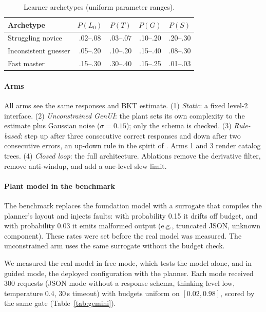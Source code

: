 \documentclass[conference]{IEEEtran}
\begin{document}
\begin{table}[t]
\centering
\caption{Learner archetypes (uniform parameter ranges).}
\label{tab:archetypes}
\begin{tabular}{lcccc}
\toprule
Archetype & $P(L_0)$ & $P(T)$ & $P(G)$ & $P(S)$\\
\midrule
Struggling novice & .02--.08 & .03--.07 & .10--.20 & .20--.30\\
Inconsistent guesser & .05--.20 & .10--.20 & .15--.40 & .08--.30\\
Fast master & .15--.30 & .30--.40 & .15--.25 & .01--.03\\
\bottomrule
\end{tabular}
\end{table}

\paragraph*{Arms}
All arms see the same responses and BKT estimate. (1) \emph{Static}: a fixed
level-2 interface. (2) \emph{Unconstrained GenUI}: the plant sets its own
complexity to the estimate plus Gaussian noise ($\sigma=0.15$); only the schema
is checked. (3) \emph{Rule-based}: step up after three consecutive correct
responses and down after two consecutive errors, an up-down rule in the
spirit of \cite{levitt1971updown}. Arms 1 and 3 render catalog trees. (4) \emph{Closed loop}:
the full architecture. Ablations remove the derivative filter, remove
anti-windup, and add a one-level slew limit.

\paragraph*{Plant model in the benchmark}
The benchmark replaces the foundation model with a surrogate that compiles
the planner's layout and injects faults: with probability 0.15 it
drifts off budget, and with probability 0.03 it emits malformed output
(e.g., truncated JSON, unknown component). These rates were set before the real model was measured.
The unconstrained arm uses the same surrogate without the budget check.

We measured the real model in free mode, which tests the model alone, and
in guided mode, the deployed configuration with the planner. Each mode received 300 requests (JSON mode without a response
schema, thinking level low, temperature 0.4, 30\,s timeout) with budgets
uniform on $[0.02,0.98]$, scored by the same gate (Table~\ref{tab:gemini}).
\end{document}
